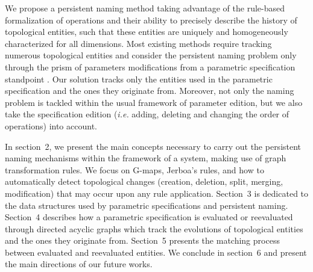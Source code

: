 We propose a persistent
naming method taking advantage of the %
rule-based
formalization
of operations and their ability to precisely describe the history
of topological entities, such that these entities are uniquely and
homogeneously characterized for all dimensions.  Most existing methods require  tracking
numerous topological entities and consider the persistent naming problem only
through the prism of parameters modifications
from
a parametric specification standpoint \cite{KRIPAC1997, chen1995editability, wu2001face}. Our solution tracks
only the entities used in the parametric specification and the
ones they originate from. Moreover, not only the naming problem is tackled within the usual framework of  parameter edition, but we also take the specification edition (\textit{i.e.} adding, deleting and changing the order of operations) into account.

In section~2, we present the
main concepts necessary to carry out the persistent naming
mechanisms within the framework of a system, making use of
graph transformation rules. We
focus on G-maps, Jerboa’s rules, and how to
automatically detect topological
changes (creation, deletion, split, merging, modification) that
may occur upon any rule application. Section~3 is dedicated to the data structures
used by parametric specifications and persistent naming. Section~4 describes how
a parametric specification is evaluated or reevaluated through directed acyclic graphs which track the evolutions of topological entities and the %
ones
they originate from. Section~5 presents the matching process between evaluated and reevaluated entities. We conclude in section~6 and present the main directions of our future works.


